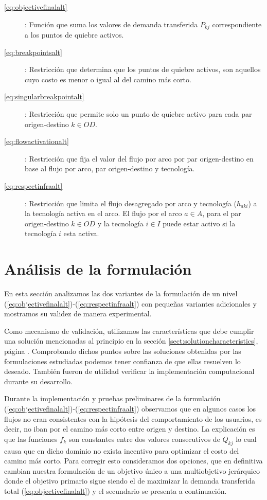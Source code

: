 \begin{description}
  \item[\ref{eq:objectivefinalalt}]: Función que suma los valores de demanda transferida $P_{kj}$ correspondiente a los puntos de quiebre activos.
  \item[\ref{eq:breakpointsalt}]: Restricción que determina que los puntos de quiebre activos, son aquellos cuyo costo es menor o igual al del camino más corto.
  \item[\ref{eq:singularbreakpointalt}]: Restricción que permite solo un punto de quiebre activo para cada par origen-destino $k \in OD$.
  \item[\ref{eq:flowactivationalt}]: Restricción que fija el valor del flujo por arco por par origen-destino en base al flujo por arco, par origen-destino y tecnología.
  \item[\ref{eq:respectinfraalt}]: Restricción que limita el flujo desagregado por arco y tecnología ($h_{aki}$) a la tecnología activa en el arco. El flujo por el arco $a \in A$, para el par origen-destino $k \in OD$ y la tecnología $i \in I$ puede estar activo si la tecnología $i$ esta activa.
\end{description}

\section{Análisis de la formulación}

En esta sección analizamos las dos variantes de la formulación de un nivel (\ref{eq:objectivefinalalt})-(\ref{eq:respectinfraalt}) con pequeñas variantes adicionales y mostramos su validez de manera experimental.

Como mecanismo de validación, utilizamos las características que debe cumplir una solución mencionadas al principio en la sección \ref{sect:solutioncharacteristics}, página \pageref{sect:solutioncharacteristics}. Comprobando dichos puntos sobre las soluciones obtenidas por las formulaciones estudiadas podemos tener confianza de que ellas resuelven lo deseado. También fueron de utilidad verificar la implementación computacional durante su desarrollo.


Durante la implementación y pruebas preliminares de la formulación (\ref{eq:objectivefinalalt})-(\ref{eq:respectinfraalt}) observamos que en algunos casos los flujos no eran consistentes con la hipótesis del comportamiento de los usuarios, es decir, no iban por el camino más corto entre origen y destino. La explicación es que las funciones $f_k$ son constantes entre dos valores consecutivos de $Q_{kj}$ lo cual causa que en dicho dominio no exista incentivo para optimizar el costo del camino más corto. Para corregir esto consideramos dos opciones, que en definitiva cambian nuestra formulación de un objetivo único a una multiobjetivo jerárquico donde el objetivo primario sigue siendo el de maximizar la demanda transferida total (\ref{eq:objectivefinalalt}) y el secundario se presenta a continuación.

